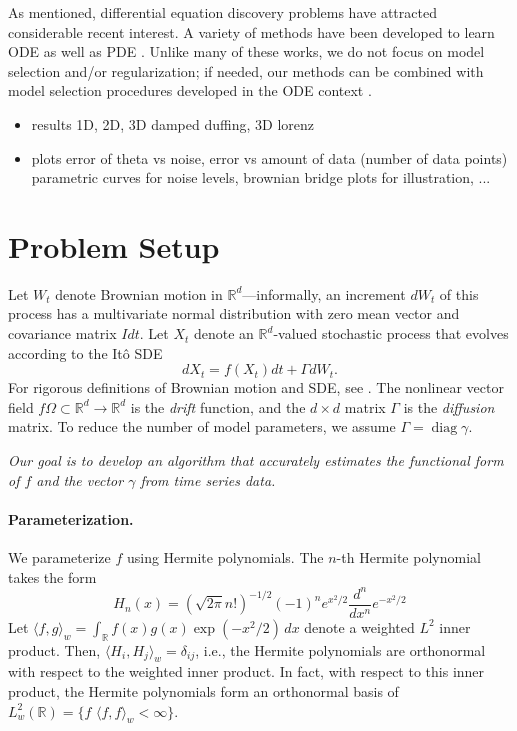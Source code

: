 \documentclass{article}
\newcommand{\opdiag}{\ensuremath{\operatorname{diag}}}
\begin{document}
As mentioned, differential equation discovery problems have attracted considerable recent interest.  A variety of methods have been developed to learn ODE \cite{brunton_discovering_2016, schon_probabilistic_2017, chen_network_2017, tran_exact_2017, schaeffer_extracting_2017, schaeffer_learning_2017, quade_sparse_2018} as well as PDE \cite{schaeffer_sparse_2013, raissi_machine_2017, rudy_data-driven_2017, raissi_hidden_2018}.  Unlike many of these works, we do not focus on model selection and/or regularization; if needed, our methods can be combined with model selection procedures developed in the ODE context \cite{mangan_inferring_2016, mangan_model_2017}.

\begin{itemize}
\item results 1D, 2D, 3D damped duffing, 3D lorenz
\item plots error of theta vs noise, error vs amount of data (number of data points) parametric curves for noise levels, brownian bridge plots for illustration, ...
\end{itemize}

\section{Problem Setup}
Let $W_t$ denote Brownian motion in $\mathbb{R}^d$---informally, an increment $dW_t$ of this process has a multivariate normal distribution with zero mean vector and covariance matrix $I dt$.  Let $X_t$ denote an $\mathbb{R}^d$-valued stochastic process that evolves according to the It\^{o} SDE
\begin{equation} \label{eqnsde}
d X_t = f( X_t) dt + \Gamma d W_t.
\end{equation}
For rigorous definitions of Brownian motion and SDE, see \cite{bhattacharya_stochastic_2009, oksendal_stochastic_2003}.  The nonlinear vector field $f  \Omega \subset \mathbb{R}^d \to \mathbb{R}^d$ is the \emph{drift} function, and the $d \times d$ matrix $\Gamma$ is the \emph{diffusion} matrix.  To reduce the number of model parameters, we assume $\Gamma = \opdiag \gamma$.

\emph{Our goal is to develop an algorithm that accurately estimates the functional form of $f$ and the vector $\gamma$ from time series data.}

\paragraph{Parameterization.} We parameterize $f$ using Hermite polynomials.  The $n$-th Hermite polynomial takes the form
\begin{equation}
\label{eqnhermdef}
H_n(x) = (\sqrt{2 \pi} n!)^{-1/2} (-1)^n e^{x^2/2} \dfrac{d^n}{dx^n} e^{-x^2/2}
\end{equation}
Let $\langle f, g \rangle_w = \int_{\mathbb{R}} f(x) g(x) \exp(-x^2/2) \, dx$ denote a weighted $L^2$ inner product.  Then, $\langle H_i, H_j \rangle_w = \delta_{ij}$, i.e., the Hermite polynomials are orthonormal with respect to the weighted inner product.  In fact, with respect to this inner product, the Hermite polynomials form an orthonormal basis of $L^2_w(\mathbb{R}) = \{ f \,  \, \langle f, f \rangle_w < \infty \}$.
\end{document}
